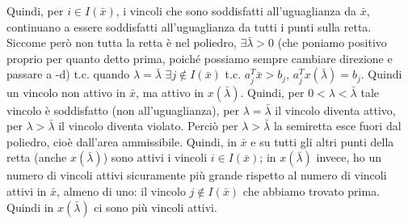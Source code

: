 Quindi, per $i \in I(\bar{x})$, i vincoli che sono soddisfatti all'uguaglianza da $\bar{x}$, continuano a essere soddisfatti all'uguaglianza da tutti i punti sulla retta. Siccome però non tutta la retta è nel poliedro, $\exists \bar{\lambda} > 0$ (che poniamo positivo proprio per quanto detto prima, poiché possiamo sempre cambiare direzione e passare a -d) t.c. quando $\lambda = \bar{\lambda}$ $\exists j \notin I(\bar{x})$ t.c. $a_j^T\bar{x} > b_j$, $a_j^Tx(\bar{\lambda}) = b_j$. Quindi un vincolo non attivo in $\bar{x}$, ma attivo in $x(\bar{\lambda})$. Quindi, per $0 < \lambda < \bar{\lambda}$ tale vincolo è soddisfatto (non all'uguaglianza), per $\lambda = \bar{\lambda}$ il vincolo diventa attivo, per $\lambda > \bar{\lambda}$ il vincolo diventa violato. Perciò per $\lambda > \bar{\lambda}$ la semiretta esce fuori dal poliedro, cioè dall'area ammissibile. Quindi, in $\bar{x}$ e su tutti gli altri punti della retta (anche $x(\bar{\lambda})$) sono attivi i vincoli $i \in I(\bar{x})$; in $x(\bar{\lambda})$ invece, ho un numero di vincoli attivi sicuramente più grande rispetto al numero di vincoli attivi in $\bar{x}$, almeno di uno: il vincolo $j \notin I(\bar{x})$ che abbiamo trovato prima. Quindi in $x(\bar{\lambda})$ ci sono più vincoli attivi. 


\vspace{1cm}

